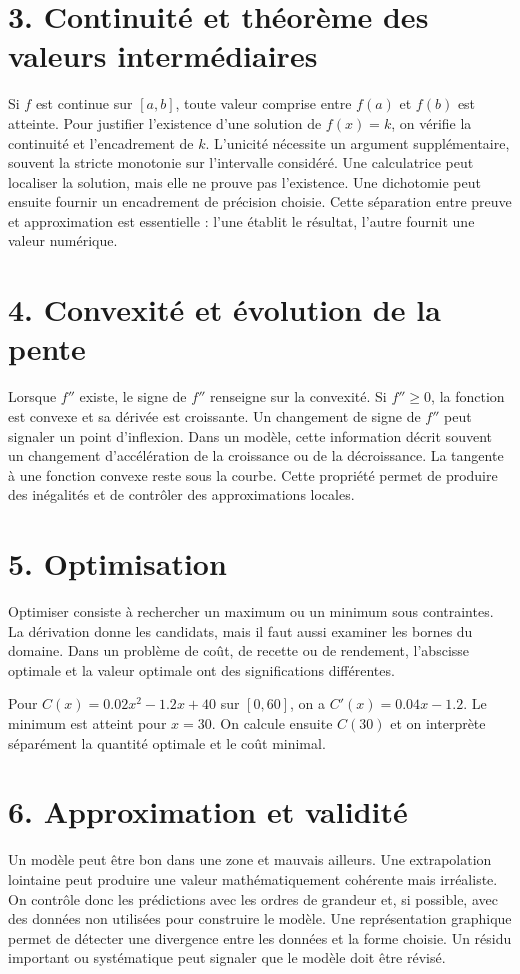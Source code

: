 \section{3. Continuité et théorème des valeurs intermédiaires}
Si $f$ est continue sur $[a,b]$, toute valeur comprise entre $f(a)$ et $f(b)$ est atteinte. Pour justifier l'existence d'une solution de $f(x)=k$, on vérifie la continuité et l'encadrement de $k$. L'unicité nécessite un argument supplémentaire, souvent la stricte monotonie sur l'intervalle considéré.
Une calculatrice peut localiser la solution, mais elle ne prouve pas l'existence. Une dichotomie peut ensuite fournir un encadrement de précision choisie. Cette séparation entre preuve et approximation est essentielle : l'une établit le résultat, l'autre fournit une valeur numérique.
\section{4. Convexité et évolution de la pente}
Lorsque $f''$ existe, le signe de $f''$ renseigne sur la convexité. Si $f''\geq0$, la fonction est convexe et sa dérivée est croissante. Un changement de signe de $f''$ peut signaler un point d'inflexion. Dans un modèle, cette information décrit souvent un changement d'accélération de la croissance ou de la décroissance.
La tangente à une fonction convexe reste sous la courbe. Cette propriété permet de produire des inégalités et de contrôler des approximations locales.
\section{5. Optimisation}
Optimiser consiste à rechercher un maximum ou un minimum sous contraintes. La dérivation donne les candidats, mais il faut aussi examiner les bornes du domaine. Dans un problème de coût, de recette ou de rendement, l'abscisse optimale et la valeur optimale ont des significations différentes.
\begin{exemple}
Pour $C(x)=0.02x^2-1.2x+40$ sur $[0,60]$, on a $C'(x)=0.04x-1.2$. Le minimum est atteint pour $x=30$. On calcule ensuite $C(30)$ et on interprète séparément la quantité optimale et le coût minimal.
\end{exemple}
\section{6. Approximation et validité}
Un modèle peut être bon dans une zone et mauvais ailleurs. Une extrapolation lointaine peut produire une valeur mathématiquement cohérente mais irréaliste. On contrôle donc les prédictions avec les ordres de grandeur et, si possible, avec des données non utilisées pour construire le modèle.
Une représentation graphique permet de détecter une divergence entre les données et la forme choisie. Un résidu important ou systématique peut signaler que le modèle doit être révisé.

